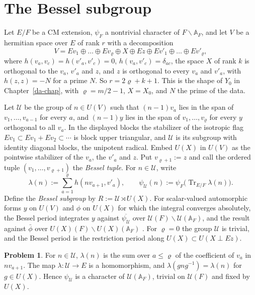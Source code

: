 \documentclass[reqno]{amsart}
\newcounter{chap}
\theoremstyle{definition}
\newtheorem{problem}{Problem}[section]
\theoremstyle{plain}
\theoremstyle{remark}
\newcommand{\A}{\mathbb A}
\newcommand{\Uc}{{\mathcal{U}}}
\newcommand{\Tr}{\operatorname{Tr}}
\begin{document}
\section{The Bessel subgroup}\label{sec:subgroup}

Let \(E/F\) be a CM extension, \(\psi_F\) a nontrivial character of \(F\backslash\A_F\), and let \(V\) be a hermitian space over \(E\) of rank \(r\) with a decomposition
\[
 V=Ev_1\oplus\dots\oplus Ev_\varrho\oplus X\oplus Ez\oplus Ev'_1\oplus\dots\oplus Ev'_\varrho ,
\]
where \(h(v_a,v_c)=h(v'_a,v'_c)=0\), \(h(v_a,v'_c)=\delta_{ac}\), the space \(X\) of rank \(k\) is orthogonal to the \(v_a\), \(v'_a\) and \(z\), and \(z\) is orthogonal to every \(v_a\) and \(v'_a\), with \(h(z,z)=-N\) for a prime \(N\).  So \(r=2\varrho+k+1\).  This is the shape of \(Y_0\) in Chapter~\ref{da-chap}, with \(\varrho=m/2-1\), \(X=X_0\), and \(N\) the prime of the data.

Let \(\Uc\) be the group of \(n\in U(V)\) such that \((n-1)v_a\) lies in the span of \(v_1,\dots,v_{a-1}\) for every \(a\), and \((n-1)y\) lies in the span of \(v_1,\dots,v_\varrho\) for every \(y\) orthogonal to all \(v_a\).  In the displayed blocks the stabilizer of the isotropic flag \(Ev_1\subset Ev_1+Ev_2\subset\cdots\) is block upper triangular, and \(\Uc\) is its subgroup with identity diagonal blocks, the unipotent radical.  Embed \(U(X)\) in \(U(V)\) as the pointwise stabilizer of the \(v_a\), the \(v'_a\) and \(z\).  Put \(v_{\varrho+1}:=z\) and call the ordered tuple \((v_1,\dots,v_{\varrho+1})\) the \emph{Bessel tuple}.  For \(n\in \Uc\), write
\[
 \lambda(n):=\sum_{a=1}^\varrho h(nv_{a+1},v'_a),\qquad \psi_{\Uc}(n):=\psi_F\bigl(\Tr_{E/F}\lambda(n)\bigr).
\]
Define the \emph{Bessel subgroup} by \(R:=\Uc\rtimes U(X)\).  For scalar-valued automorphic forms \(y\) on \(U(V)\) and \(\phi\) on \(U(X)\) for which the integral converges absolutely, the Bessel period integrates \(y\) against \(\overline{\psi_{\Uc}}\) over \(\Uc(F)\backslash \Uc(\A_F)\), and the result against \(\bar\phi\) over \(U(X)(F)\backslash U(X)(\A_F)\) \cite[\S\S12, 23]{GGP}.  For \(\varrho=0\) the group \(\Uc\) is trivial, and the Bessel period is the restriction period along \(U(X)\subset U(X\perp Ez)\).

\begin{problem}\label{pr:lambda}
For \(n\in \Uc\), \(\lambda(n)\) is the sum over \(a\le \varrho\) of the coefficient of \(v_a\) in \(nv_{a+1}\).  The map \(\lambda\colon \Uc\to E\) is a homomorphism, and \(\lambda(gng^{-1})=\lambda(n)\) for \(g\in U(X)\).  Hence \(\psi_{\Uc}\) is a character of \(\Uc(\A_F)\), trivial on \(\Uc(F)\) and fixed by \(U(X)\).
\end{problem}
\end{document}
